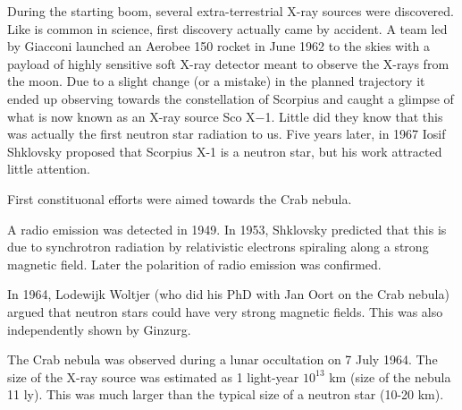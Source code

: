

During the starting boom, several extra-terrestrial X-ray sources were discovered.
Like is common in science, first discovery actually came by accident.
A team led by Giacconi launched an Aerobee 150 rocket in June 1962 to the skies with a payload of highly sensitive soft X-ray detector meant to observe the X-rays from the moon.
Due to a slight change (or a mistake) in the planned trajectory it ended up observing towards the constellation of Scorpius and caught a glimpse of what is now known as an X-ray source Sco X$-$1.
Little did they know that this was actually the first neutron star radiation to us.
Five years later, in 1967 Iosif Shklovsky proposed that Scorpius X-1 is a neutron star\cite{Shklovsky67}, but his work attracted little attention.

First constituonal efforts were aimed towards the Crab nebula.

A radio emission was detected in 1949. 
In 1953, Shklovsky predicted that this is due to synchrotron radiation by relativistic electrons spiraling along a strong magnetic field. 
Later the polarition of radio emission was confirmed. 

In 1964, Lodewijk Woltjer (who did his PhD with Jan Oort on the Crab nebula) argued that neutron stars could have very strong magnetic fields. \cite{Woltjer64}
This was also independently shown by Ginzurg. \cite{Ginzburg64}


The Crab nebula was observed during a lunar occultation on 7 July 1964.\cite{BBC64}
The size of the X-ray source was estimated as 1 light-year $10^{13}$ km (size of the nebula 11 ly). 
This was much larger than the typical size of a neutron star (10-20 km).

